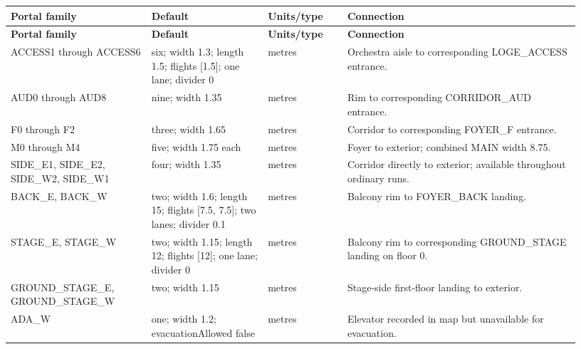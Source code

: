 \documentclass[11pt]{article}
\begin{document}
{\small\setlength{\tabcolsep}{4pt}

\begin{longtable}{@{}p{0.23\linewidth}p{0.19\linewidth}p{0.13\linewidth}p{0.38\linewidth}@{}}

\toprule

\textbf{Portal family} & \textbf{Default} & \textbf{Units/type} & \textbf{Connection} \\

\midrule\endfirsthead

\toprule

\textbf{Portal family} & \textbf{Default} & \textbf{Units/type} & \textbf{Connection} \\

\midrule\endhead

\bottomrule\endfoot

ACCESS1 through ACCESS6 & six; width 1.3; length 1.5; flights [1.5]; one lane; divider 0 & metres & Orchestra aisle to corresponding LOGE\_ACCESS entrance. \\

AUD0 through AUD8 & nine; width 1.35 & metres & Rim to corresponding CORRIDOR\_AUD entrance. \\

F0 through F2 & three; width 1.65 & metres & Corridor to corresponding FOYER\_F entrance. \\

M0 through M4 & five; width 1.75 each & metres & Foyer to exterior; combined MAIN width 8.75. \\

SIDE\_E1, SIDE\_E2, SIDE\_W2, SIDE\_W1 & four; width 1.35 & metres & Corridor directly to exterior; available throughout ordinary runs. \\

BACK\_E, BACK\_W & two; width 1.6; length 15; flights [7.5, 7.5]; two lanes; divider 0.1 & metres & Balcony rim to FOYER\_BACK landing. \\

STAGE\_E, STAGE\_W & two; width 1.15; length 12; flights [12]; one lane; divider 0 & metres & Balcony rim to corresponding GROUND\_STAGE landing on floor 0. \\

GROUND\_STAGE\_E, GROUND\_STAGE\_W & two; width 1.15 & metres & Stage-side first-floor landing to exterior. \\

ADA\_W & one; width 1.2; evacuationAllowed false & metres & Elevator recorded in map but unavailable for evacuation. \\

\end{longtable}

}
\end{document}
